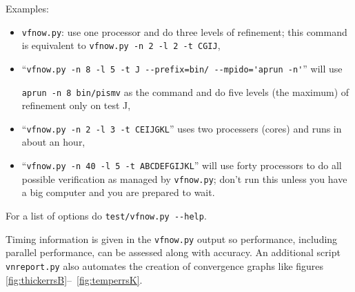 \documentclass[11pt,final]{amsart}
\begin{document}
Examples:
\begin{itemize}
\item \verb|vfnow.py|: use one processor and do three levels of refinement; this command is equivalent to \verb|vfnow.py -n 2 -l 2 -t CGIJ|,
\item ``\verb|vfnow.py -n 8 -l 5 -t J --prefix=bin/ --mpido='aprun -n'|'' will use

\noindent \verb|aprun -n 8 bin/pismv| as the command and do five levels (the maximum) of refinement only on test J,
\item ``\verb|vfnow.py -n 2 -l 3 -t CEIJGKL|'' uses two processers (cores) and runs in about an hour,
\item ``\verb|vfnow.py -n 40 -l 5 -t ABCDEFGIJKL|'' will use forty processors to do all possible verification as managed by \verb|vfnow.py|; don't run this unless you have a big computer and you are prepared to wait.
\end{itemize}

For a list of options do \verb|test/vfnow.py --help|.

Timing information is given in the \verb|vfnow.py| output so performance, including parallel performance, can be assessed along with accuracy.  An additional script \verb|vnreport.py| also automates the creation of convergence graphs like figures \ref{fig:thickerrsB}--~\ref{fig:temperrsK}.


\label{sect:index}
\printindex
\end{document}
